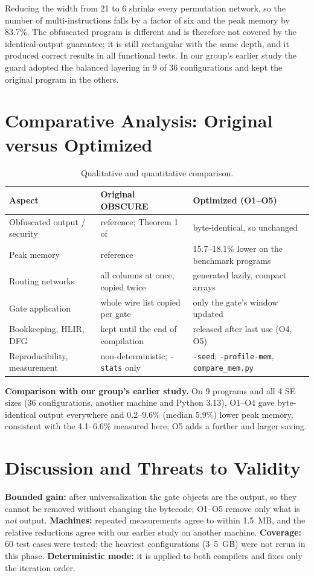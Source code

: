 \documentclass[12pt,a4paper,oneside]{report}
\newcommand{\code}[1]{\texttt{#1}}
\begin{document}
Reducing the width from 21 to 6 shrinks every permutation network, so the number of
multi-instructions falls by a factor of six and the peak memory by 83.7\%. The obfuscated program
is different and is therefore not covered by the identical-output guarantee; it is still
rectangular with the same depth, and it produced correct results in all functional tests. In our
group's earlier study the guard adopted the balanced layering in 9 of 36 configurations and kept
the original program in the others.

\section{Comparative Analysis: Original versus Optimized}
\begin{table}[H]
\centering\small
\caption{Qualitative and quantitative comparison.}
\label{tab:compare}
\footnotesize
\begin{tabularx}{\textwidth}{@{}l X X@{}}
\toprule
Aspect & Original OBSCURE & Optimized (O1--O5)\\ \midrule
Obfuscated output / security & reference; Theorem 1 of \cite{obscure} & byte-identical, so unchanged\\
Peak memory & reference & 15.7--18.1\% lower on the benchmark programs\\
Routing networks & all columns at once, copied twice & generated lazily, compact arrays\\
Gate application & whole wire list copied per gate & only the gate's window updated\\
Bookkeeping, HLIR, DFG & kept until the end of compilation & released after last use (O4, O5)\\
Reproducibility, measurement & non-deterministic; \code{-stats} only & \code{-seed}; \code{-profile-mem}, \code{compare\_mem.py}\\
\bottomrule
\end{tabularx}
\end{table}

\textbf{Comparison with our group's earlier study.} On 9 programs and all 4 SE sizes (36
configurations, another machine and Python 3.13), O1--O4 gave byte-identical output everywhere and
0.2--9.6\% (median 5.9\%) lower peak memory, consistent with the 4.1--6.6\% measured here; O5 adds a
further and larger saving.

\section{Discussion and Threats to Validity}
\textbf{Bounded gain:} after universalization the gate objects are the output, so they cannot be
removed without changing the bytecode; O1--O5 remove only what is \emph{not} output.
\textbf{Machines:} repeated measurements agree to within 1.5~MB, and the relative reductions agree
with our earlier study on another machine.
\textbf{Coverage:} 60 test cases were tested; the heaviest configurations (3--5~GB) were not rerun
in this phase.
\textbf{Deterministic mode:} it is applied to both compilers and fixes only the iteration order.
\end{document}
